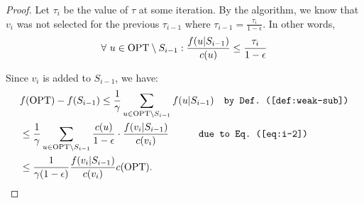 \documentclass[10pt]{article} %
\newtheorem{lemma}[theorem]{Lemma}
\theoremstyle{remark}
\newcommand{\OPT}{{\rm OPT}}
\begin{document}
\begin{proof}
    
 Let $\tau_i$ be the value of $\tau$ at some iteration. By the algorithm, we know that $v_i$ was not selected for the previous $\tau_{i-1}$ where
$\tau_{i-1} = \frac{\tau_i}{1-\epsilon}$. In other words, 
\begin{equation}
\forall ~ u\in \OPT \setminus S_{i-1}: \frac{f(u|S_{i-1})}{c(u)}\leq \frac{\tau_i}{1-\epsilon}
\label{eq:i-1-t}
\end{equation}

Since $v_i$ is added to $S_{i-1}$, we have: 
\begin{align*}
    & f(\OPT)-f(S_{i-1}) \leq \frac{1}{\gamma} \sum_{u\in \OPT \setminus S_{i-1}} f(u|S_{i-1}) \quad\mbox{\tt  by Def.~(\ref{def:weak-sub})} \\
    &\leq \frac{1}{\gamma} \sum_{u\in \OPT \setminus S_{i-1}} \frac{c(u)}{1-\epsilon} \cdot \frac{f(v_i|S_{i-1})}{c(v_i)}  \quad\quad\quad\mbox{\tt  due to Eq.~(\ref{eq:i-2})} \\
    &\leq \frac{1}{\gamma(1-\epsilon)} \frac{f(v_i|S_{i-1})}{c(v_i)} c(\OPT).
\end{align*}
       
  
\end{proof}

\end{document}
